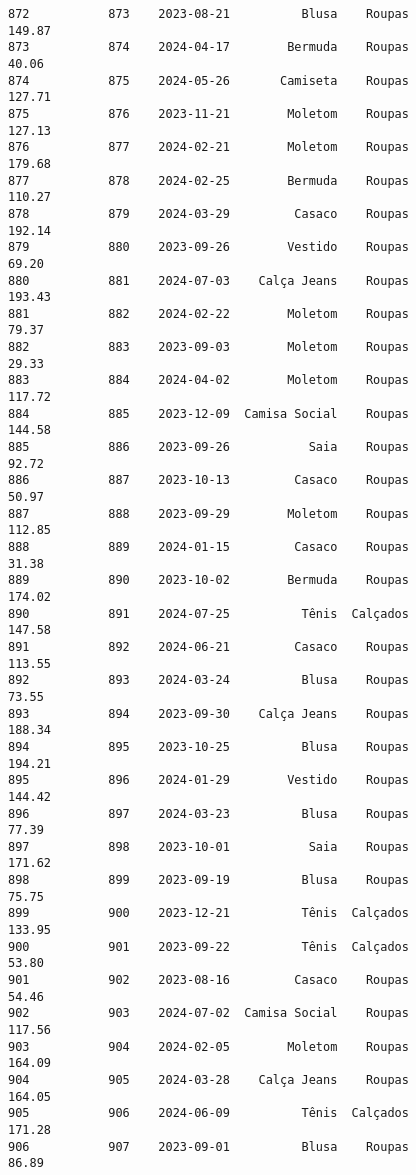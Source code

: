 \documentclass[11pt]{article}
\begin{document}
\begin{Verbatim}[commandchars=\\\{\}]
872           873    2023-08-21          Blusa    Roupas          149.87   
873           874    2024-04-17        Bermuda    Roupas           40.06   
874           875    2024-05-26       Camiseta    Roupas          127.71   
875           876    2023-11-21        Moletom    Roupas          127.13   
876           877    2024-02-21        Moletom    Roupas          179.68   
877           878    2024-02-25        Bermuda    Roupas          110.27   
878           879    2024-03-29         Casaco    Roupas          192.14   
879           880    2023-09-26        Vestido    Roupas           69.20   
880           881    2024-07-03    Calça Jeans    Roupas          193.43   
881           882    2024-02-22        Moletom    Roupas           79.37   
882           883    2023-09-03        Moletom    Roupas           29.33   
883           884    2024-04-02        Moletom    Roupas          117.72   
884           885    2023-12-09  Camisa Social    Roupas          144.58   
885           886    2023-09-26           Saia    Roupas           92.72   
886           887    2023-10-13         Casaco    Roupas           50.97   
887           888    2023-09-29        Moletom    Roupas          112.85   
888           889    2024-01-15         Casaco    Roupas           31.38   
889           890    2023-10-02        Bermuda    Roupas          174.02   
890           891    2024-07-25          Tênis  Calçados          147.58   
891           892    2024-06-21         Casaco    Roupas          113.55   
892           893    2024-03-24          Blusa    Roupas           73.55   
893           894    2023-09-30    Calça Jeans    Roupas          188.34   
894           895    2023-10-25          Blusa    Roupas          194.21   
895           896    2024-01-29        Vestido    Roupas          144.42   
896           897    2024-03-23          Blusa    Roupas           77.39   
897           898    2023-10-01           Saia    Roupas          171.62   
898           899    2023-09-19          Blusa    Roupas           75.75   
899           900    2023-12-21          Tênis  Calçados          133.95   
900           901    2023-09-22          Tênis  Calçados           53.80   
901           902    2023-08-16         Casaco    Roupas           54.46   
902           903    2024-07-02  Camisa Social    Roupas          117.56   
903           904    2024-02-05        Moletom    Roupas          164.09   
904           905    2024-03-28    Calça Jeans    Roupas          164.05   
905           906    2024-06-09          Tênis  Calçados          171.28   
906           907    2023-09-01          Blusa    Roupas           86.89   

\end{Verbatim}
\end{document}
